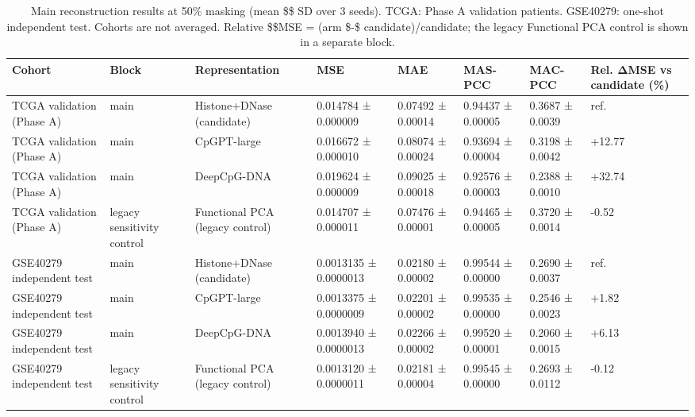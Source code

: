 \begin{table}[t]
\centering
\small
\begin{tabular}{llllllll}
\toprule
Cohort & Block & Representation & MSE & MAE & MAS-PCC & MAC-PCC & Rel. ΔMSE vs candidate (\%) \\
\midrule
TCGA validation (Phase A) & main & Histone+DNase (candidate) & 0.014784 ± 0.000009 & 0.07492 ± 0.00014 & 0.94437 ± 0.00005 & 0.3687 ± 0.0039 & ref. \\
TCGA validation (Phase A) & main & CpGPT-large & 0.016672 ± 0.000010 & 0.08074 ± 0.00024 & 0.93694 ± 0.00004 & 0.3198 ± 0.0042 & +12.77 \\
TCGA validation (Phase A) & main & DeepCpG-DNA & 0.019624 ± 0.000009 & 0.09025 ± 0.00018 & 0.92576 ± 0.00003 & 0.2388 ± 0.0010 & +32.74 \\
TCGA validation (Phase A) & legacy sensitivity control & Functional PCA (legacy control) & 0.014707 ± 0.000011 & 0.07476 ± 0.00001 & 0.94465 ± 0.00005 & 0.3720 ± 0.0014 & -0.52 \\
GSE40279 independent test & main & Histone+DNase (candidate) & 0.0013135 ± 0.0000013 & 0.02180 ± 0.00002 & 0.99544 ± 0.00000 & 0.2690 ± 0.0037 & ref. \\
GSE40279 independent test & main & CpGPT-large & 0.0013375 ± 0.0000009 & 0.02201 ± 0.00002 & 0.99535 ± 0.00000 & 0.2546 ± 0.0023 & +1.82 \\
GSE40279 independent test & main & DeepCpG-DNA & 0.0013940 ± 0.0000013 & 0.02266 ± 0.00002 & 0.99520 ± 0.00001 & 0.2060 ± 0.0015 & +6.13 \\
GSE40279 independent test & legacy sensitivity control & Functional PCA (legacy control) & 0.0013120 ± 0.0000011 & 0.02181 ± 0.00004 & 0.99545 ± 0.00000 & 0.2693 ± 0.0112 & -0.12 \\
\bottomrule
\end{tabular}
\caption{Main reconstruction results at 50\% masking (mean \$\pm\$ SD over 3 seeds). TCGA: Phase A validation patients. GSE40279: one-shot independent test. Cohorts are not averaged. Relative \$\Delta\$MSE = (arm \$-\$ candidate)/candidate; the legacy Functional PCA control is shown in a separate block.}
\label{tab:main}
\end{table}
